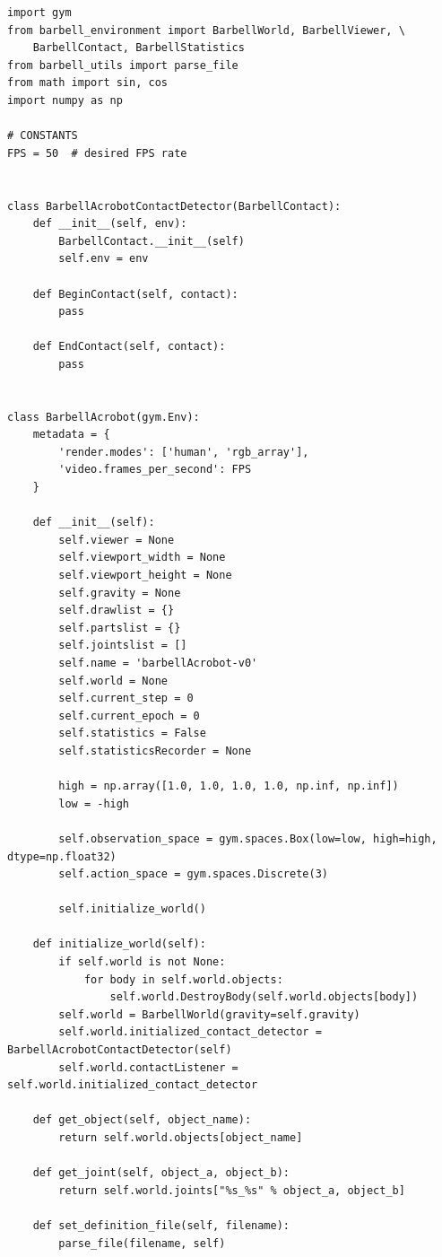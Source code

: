 \documentclass[cic,tc]{iiufrgs}
\newenvironment{longlisting}{\captionsetup{type=listing}}{}
\begin{document}
\begin{longlisting}
\begin{verbatim}
import gym
from barbell_environment import BarbellWorld, BarbellViewer, \
    BarbellContact, BarbellStatistics
from barbell_utils import parse_file
from math import sin, cos
import numpy as np

# CONSTANTS
FPS = 50  # desired FPS rate


class BarbellAcrobotContactDetector(BarbellContact):
    def __init__(self, env):
        BarbellContact.__init__(self)
        self.env = env

    def BeginContact(self, contact):
        pass

    def EndContact(self, contact):
        pass


class BarbellAcrobot(gym.Env):
    metadata = {
        'render.modes': ['human', 'rgb_array'],
        'video.frames_per_second': FPS
    }

    def __init__(self):
        self.viewer = None
        self.viewport_width = None
        self.viewport_height = None
        self.gravity = None
        self.drawlist = {}
        self.partslist = {}
        self.jointslist = []
        self.name = 'barbellAcrobot-v0'
        self.world = None
        self.current_step = 0
        self.current_epoch = 0
        self.statistics = False
        self.statisticsRecorder = None

        high = np.array([1.0, 1.0, 1.0, 1.0, np.inf, np.inf])
        low = -high

        self.observation_space = gym.spaces.Box(low=low, high=high, dtype=np.float32)
        self.action_space = gym.spaces.Discrete(3)

        self.initialize_world()

    def initialize_world(self):
        if self.world is not None:
            for body in self.world.objects:
                self.world.DestroyBody(self.world.objects[body])
        self.world = BarbellWorld(gravity=self.gravity)
        self.world.initialized_contact_detector = BarbellAcrobotContactDetector(self)
        self.world.contactListener = self.world.initialized_contact_detector

    def get_object(self, object_name):
        return self.world.objects[object_name]

    def get_joint(self, object_a, object_b):
        return self.world.joints["%s_%s" % object_a, object_b]

    def set_definition_file(self, filename):
        parse_file(filename, self)


\end{verbatim}
\end{longlisting}
\end{document}
